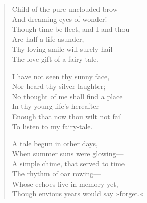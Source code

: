 \vspace*{\fill}
\begin{verse}
	\begin{altverse}
Child of the pure unclouded brow\\
And dreaming eyes of wonder!\\
Though time be fleet, and I and thou\\
Are half a life asunder,\\
Thy loving smile will surely hail\\
The love-gift of a fairy-tale.
\end{altverse}

	\begin{altverse}
I have not seen thy sunny face,\\
Nor heard thy silver laughter;\\
No thought of me shall find a place\\
In thy young life’s hereafter—\\
Enough that now thou wilt not fail\\
To listen to my fairy-tale.
\end{altverse}

	\begin{altverse}
A tale begun in other days,\\
When summer suns were glowing—\\
A simple chime, that served to time\\
The rhythm of oar rowing—\\
Whose echoes live in memory yet,\\
Though envious years would say »forget.«
\end{altverse}
\end{verse}
\vfill
\clearpage

